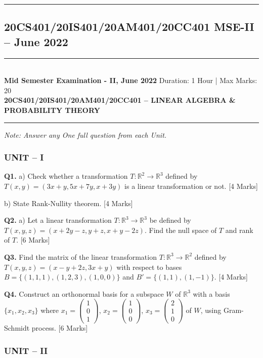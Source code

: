 \documentclass[11pt,a4paper]{article}
\newcommand{\examheader}[4]{
\noindent\rule{\textwidth}{0.5pt}\\
\textbf{#1} \hfill Duration: #3 | Max Marks: #4\\
\textbf{#2}\\
\rule{\textwidth}{0.5pt}
\vspace{0.2cm}
}
\begin{document}
\vspace{0.5cm}
\hrule
\vspace{0.5cm}

\subsection{20CS401/20IS401/20AM401/20CC401 MSE-II -- June 2022}
\examheader{Mid Semester Examination - II, June 2022}{20CS401/20IS401/20AM401/20CC401 -- LINEAR ALGEBRA \& PROBABILITY THEORY}{1 Hour}{20}

\textit{Note: Answer any One full question from each Unit.}

\subsubsection*{UNIT -- I}

\textbf{Q1.} a) Check whether a transformation $T: \mathbb{R}^2 \to \mathbb{R}^3$ defined by $T(x,y) = (3x+y, 5x+7y, x+3y)$ is a linear transformation or not. \hfill [4 Marks]

b) State Rank-Nullity theorem. \hfill [4 Marks]

\textbf{Q2.} a) Let a linear transformation $T: \mathbb{R}^3 \to \mathbb{R}^3$ be defined by $T(x,y,z) = (x+2y-z, y+z, x+y-2z)$. Find the null space of $T$ and rank of $T$. \hfill [6 Marks]

\textbf{Q3.} Find the matrix of the linear transformation $T: \mathbb{R}^3 \to \mathbb{R}^2$ defined by $T(x,y,z) = (x-y+2z, 3x+y)$ with respect to bases $B = \{(1,1,1), (1,2,3), (1,0,0)\}$ and $B' = \{(1,1), (1,-1)\}$. \hfill [4 Marks]

\textbf{Q4.} Construct an orthonormal basis for a subspace $W$ of $\mathbb{R}^3$ with a basis $\{x_1, x_2, x_3\}$ where $x_1 = \begin{pmatrix} 1 \\ 0 \\ 1 \end{pmatrix}$, $x_2 = \begin{pmatrix} 1 \\ 0 \\ 0 \end{pmatrix}$, $x_3 = \begin{pmatrix} 2 \\ 1 \\ 0 \end{pmatrix}$ of $W$, using Gram-Schmidt process. \hfill [6 Marks]

\subsubsection*{UNIT -- II}
\end{document}
